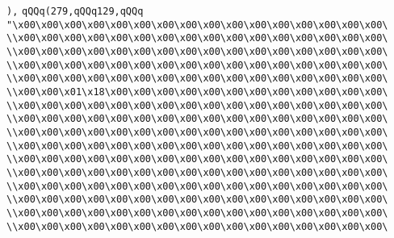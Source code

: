 \verb|),|\newline
\verb|qQQq(279,qQQq129,qQQq|\newline
\verb|"\x00\x00\x00\x00\x00\x00\x00\x00\x00\x00\x00\x00\x00\x00\x00\x00\|\newline
\verb|\\x00\x00\x00\x00\x00\x00\x00\x00\x00\x00\x00\x00\x00\x00\x00\x00\|\newline
\verb|\\x00\x00\x00\x00\x00\x00\x00\x00\x00\x00\x00\x00\x00\x00\x00\x00\|\newline
\verb|\\x00\x00\x00\x00\x00\x00\x00\x00\x00\x00\x00\x00\x00\x00\x00\x00\|\newline
\verb|\\x00\x00\x00\x00\x00\x00\x00\x00\x00\x00\x00\x00\x00\x00\x00\x00\|\newline
\verb|\\x00\x00\x01\x18\x00\x00\x00\x00\x00\x00\x00\x00\x00\x00\x00\x00\|\newline
\verb|\\x00\x00\x00\x00\x00\x00\x00\x00\x00\x00\x00\x00\x00\x00\x00\x00\|\newline
\verb|\\x00\x00\x00\x00\x00\x00\x00\x00\x00\x00\x00\x00\x00\x00\x00\x00\|\newline
\verb|\\x00\x00\x00\x00\x00\x00\x00\x00\x00\x00\x00\x00\x00\x00\x00\x00\|\newline
\verb|\\x00\x00\x00\x00\x00\x00\x00\x00\x00\x00\x00\x00\x00\x00\x00\x00\|\newline
\verb|\\x00\x00\x00\x00\x00\x00\x00\x00\x00\x00\x00\x00\x00\x00\x00\x00\|\newline
\verb|\\x00\x00\x00\x00\x00\x00\x00\x00\x00\x00\x00\x00\x00\x00\x00\x00\|\newline
\verb|\\x00\x00\x00\x00\x00\x00\x00\x00\x00\x00\x00\x00\x00\x00\x00\x00\|\newline
\verb|\\x00\x00\x00\x00\x00\x00\x00\x00\x00\x00\x00\x00\x00\x00\x00\x00\|\newline
\verb|\\x00\x00\x00\x00\x00\x00\x00\x00\x00\x00\x00\x00\x00\x00\x00\x00\|\newline
\verb|\\x00\x00\x00\x00\x00\x00\x00\x00\x00\x00\x00\x00\x00\x00\x00\x00\|\newline
